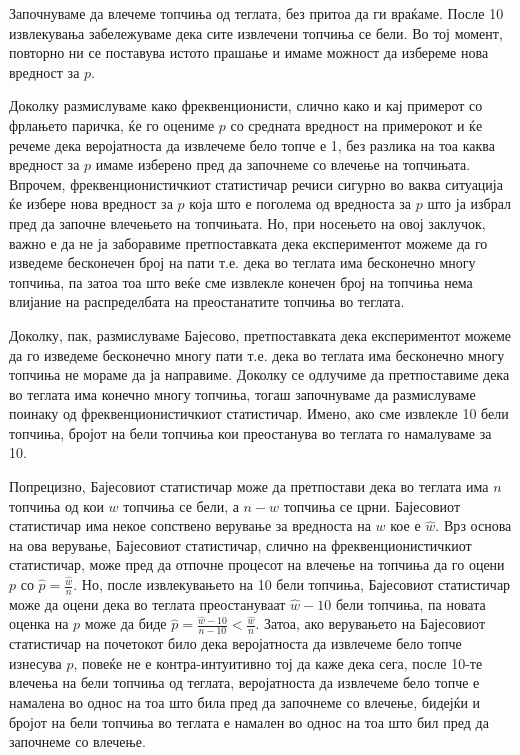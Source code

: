 \documentclass[12pt]{article}
\numberwithin{equation}{section}
\begin{document}
Започнуваме да влечеме топчиња од теглата, без притоа да ги враќаме. После 10 извлекувања забележуваме дека сите извлечени топчиња се бели. Во тој момент, повторно ни се поставува истото прашање и имаме можност да избереме нова вредност за \(p\).

Доколку размислуваме како фреквенционисти, слично како и кај примерот со фрлањето паричка, ќе го оцениме \(p\) со средната вредност на примерокот и ќе речеме дека веројатноста да извлечеме бело топче е 1, без разлика на тоа каква вредност за \(p\) имаме изберено пред да започнеме со влечење на топчињата. Впрочем, фреквенционистичкиот статистичар речиси сигурно во ваква ситуација ќе избере нова вредност за \(p\) која што е поголема од вредноста за \(p\) што ја избрал пред да започне влечењето на топчињата. Но, при носењето на овој заклучок, важно е да не ја заборавиме претпоставката дека експериментот можеме да го изведеме бесконечен број на пати т.е. дека во теглата има бесконечно многу топчиња, па затоа тоа што веќе сме извлекле конечен број на топчиња нема влијание на распределбата на преостанатите топчиња во теглата.

Доколку, пак, размислуваме Бајесово, претпоставката дека експериментот можеме да го изведеме бесконечно многу пати т.е. дека во теглата има бесконечно многу топчиња не мораме да ја направиме. Доколку се одлучиме да претпоставиме дека во теглата има конечно многу топчиња, тогаш започнуваме да размислуваме поинаку од фреквенционистичкиот статистичар. Имено, ако сме извлекле 10 бели топчиња, бројот на бели топчиња кои преостанува во теглата го намалуваме за 10.

Попрецизно, Бајесовиот статистичар може да претпостави дека во теглата има \(n\) топчиња од кои \(w\) топчиња се бели, а \(n-w\) топчиња се црни. Бајесовиот статистичар има некое сопствено верување за вредноста на \(w\) кое е \(\widehat{w}\). Врз основа на ова верување, Бајесовиот статистичар, слично на фреквенционистичкиот статистичар, може пред да отпочне процесот на влечење на топчиња да го оцени \(p\) со \(\widehat{p} = \frac{\widehat{w}}{n}\). Но, после извлекувањето на 10 бели топчиња, Бајесовиот статистичар може да оцени дека во теглата преостануваат \(\widehat{w} - 10\) бели топчиња, па новата оценка на \(p\) може да биде \(\widehat{p} = \frac{\widehat{w} - 10}{n - 10} < \frac{\widehat{w}}{n}\). Затоа, ако верувањето на Бајесовиот статистичар на почетокот било дека веројатноста да извлечеме бело топче изнесува \(p\), повеќе не е контра-интуитивно тој да каже дека сега, после 10-те влечења на бели топчиња од теглата, веројатноста да извлечеме бело топче е намалена во однос на тоа што била пред да започнеме со влечење, бидејќи и бројот на бели топчиња во теглата е намален во однос на тоа што бил пред да започнеме со влечење.
\end{document}
